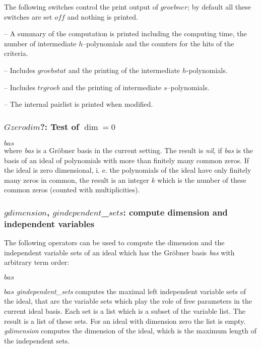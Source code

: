 The following switches control the print output of $groebner$; by
default all these switches are set $off$ and nothing is printed.
\begin{description}
\item[$groebstat$] -- A summary of the computation is printed
including the computing time, the number of intermediate
$h$--polynomials and the counters for the hits of the criteria.

\item[$trgroeb$] -- Includes $groebstat$ and the printing of the
intermediate $h$-polynomials.

\item[$trgroebs$] -- Includes $trgroeb$ and the printing of
intermediate $s$--poly\-nomials.

\item[$trgroeb1$] -- The internal pairlist is printed when modified.
\end{description}

\subsubsection{$Gzerodim$?: Test of $\dim = 0$}
\begin{description}
\item[{\it gzerodim}!?] $bas$ \\
where {\it bas} is a Gr\"obner basis in the current setting.
The result is {\it nil}, if {\it bas} is the
basis of an ideal of polynomials with more than finitely many common zeros.
If the ideal is zero dimensional, i. e. the polynomials of the ideal have only
finitely many zeros in common, the result is an integer $k$ which is the number
of these common zeros (counted with multiplicities).
\end{description}

\subsubsection{$gdimension$, $gindependent$\_$sets$: compute dimension and
independent variables}
The following operators can be used to compute the dimension
and the independent variable sets of an ideal which has the
Gr\"obner basis {\it bas} with arbitrary term order:
\begin{description}
\item[$gdimension$]$bas$
\item[$gindependent$\_$sets$]$bas$
{\it gindependent\_sets} computes the maximal
left independent variable sets of the ideal, that are
the variable sets which play the role of free parameters in the
current ideal basis. Each set is a list which is a subset of the
variable list. The result is a list of these sets. For an
ideal with dimension zero the list is empty.
{\it gdimension} computes the dimension of the ideal,
which is the maximum length of the independent sets.
\end{description}

